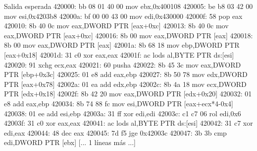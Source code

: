 \documentclass[11pt,a4paper]{article}
\begin{document}
\begin{salidan}{Salida esperada}
  420000:       bb 08 01 40 00          mov    ebx,0x400108
  420005:       be b8 03 42 00          mov    esi,0x4203b8
  42000a:       bf 00 00 43 00          mov    edi,0x430000
  42000f:       58                      pop    eax
  420010:       8b 40 0c                mov    eax,DWORD PTR [eax+0xc]
  420013:       8b 40 0c                mov    eax,DWORD PTR [eax+0xc]
  420016:       8b 00                   mov    eax,DWORD PTR [eax]
  420018:       8b 00                   mov    eax,DWORD PTR [eax]
  42001a:       8b 68 18                mov    ebp,DWORD PTR [eax+0x18]
  42001d:       31 c0                   xor    eax,eax
  42001f:       ac                      lods   al,BYTE PTR ds:[esi]
  420020:       91                      xchg   ecx,eax
  420021:       60                      pusha
  420022:       8b 45 3c                mov    eax,DWORD PTR [ebp+0x3c]
  420025:       01 e8                   add    eax,ebp
  420027:       8b 50 78                mov    edx,DWORD PTR [eax+0x78]
  42002a:       01 ea                   add    edx,ebp
  42002c:       8b 4a 18                mov    ecx,DWORD PTR [edx+0x18]
  42002f:       8b 42 20                mov    eax,DWORD PTR [edx+0x20]
  420032:       01 e8                   add    eax,ebp
  420034:       8b 74 88 fc             mov    esi,DWORD PTR [eax+ecx*4-0x4]
  420038:       01 ee                   add    esi,ebp
  42003a:       31 ff                   xor    edi,edi
  42003c:       c1 c7 06                rol    edi,0x6
  42003f:       31 c0                   xor    eax,eax
  420041:       ac                      lods   al,BYTE PTR ds:[esi]
  420042:       31 c7                   xor    edi,eax
  420044:       48                      dec    eax
  420045:       7d f5                   jge    0x42003c
  420047:       3b 3b                   cmp    edi,DWORD PTR [ebx]
[... 1 líneas más ...]
\end{salidan}
\end{document}
